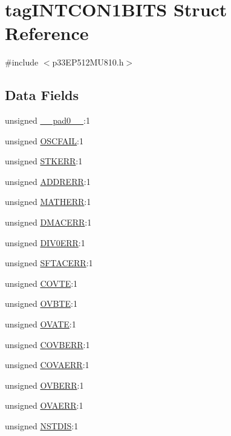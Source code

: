 \hypertarget{structtag_i_n_t_c_o_n1_b_i_t_s}{}\section{tag\+I\+N\+T\+C\+O\+N1\+B\+I\+TS Struct Reference}
\label{structtag_i_n_t_c_o_n1_b_i_t_s}


{\ttfamily \#include $<$p33\+E\+P512\+M\+U810.\+h$>$}

\subsection*{Data Fields}
\begin{DoxyCompactItemize}
\item 
unsigned \hyperlink{structtag_i_n_t_c_o_n1_b_i_t_s_adf71f3d8410c1f1dbbc96680a92c49af}{\+\_\+\+\_\+pad0\+\_\+\+\_\+}\+:1
\item 
unsigned \hyperlink{structtag_i_n_t_c_o_n1_b_i_t_s_a5aca0e68eb2fe8e5e31d661f9902bab6}{O\+S\+C\+F\+A\+IL}\+:1
\item 
unsigned \hyperlink{structtag_i_n_t_c_o_n1_b_i_t_s_a453904e3420d35daa803230b74b1f9a3}{S\+T\+K\+E\+RR}\+:1
\item 
unsigned \hyperlink{structtag_i_n_t_c_o_n1_b_i_t_s_af0137f3203737dd7dd5634f5a04fbf13}{A\+D\+D\+R\+E\+RR}\+:1
\item 
unsigned \hyperlink{structtag_i_n_t_c_o_n1_b_i_t_s_ad8910233257a22d0ce9314af2b10b6c5}{M\+A\+T\+H\+E\+RR}\+:1
\item 
unsigned \hyperlink{structtag_i_n_t_c_o_n1_b_i_t_s_a9a9b3500fd6404edc5ab96d0da50d1e0}{D\+M\+A\+C\+E\+RR}\+:1
\item 
unsigned \hyperlink{structtag_i_n_t_c_o_n1_b_i_t_s_a761775fa059db1e71b3a64e6df35037a}{D\+I\+V0\+E\+RR}\+:1
\item 
unsigned \hyperlink{structtag_i_n_t_c_o_n1_b_i_t_s_a06c5b25ec77e5dcd41176d0ec54eb613}{S\+F\+T\+A\+C\+E\+RR}\+:1
\item 
unsigned \hyperlink{structtag_i_n_t_c_o_n1_b_i_t_s_a8b496776821b526919f5206045a1d69c}{C\+O\+V\+TE}\+:1
\item 
unsigned \hyperlink{structtag_i_n_t_c_o_n1_b_i_t_s_aa828f367273680f7a31dabf827ef2b57}{O\+V\+B\+TE}\+:1
\item 
unsigned \hyperlink{structtag_i_n_t_c_o_n1_b_i_t_s_a267cc548145c20602c3d3acc50718055}{O\+V\+A\+TE}\+:1
\item 
unsigned \hyperlink{structtag_i_n_t_c_o_n1_b_i_t_s_a71647ef7c7530a785bedf55723264047}{C\+O\+V\+B\+E\+RR}\+:1
\item 
unsigned \hyperlink{structtag_i_n_t_c_o_n1_b_i_t_s_a52776cbc3fa0ce5403558dce56919f05}{C\+O\+V\+A\+E\+RR}\+:1
\item 
unsigned \hyperlink{structtag_i_n_t_c_o_n1_b_i_t_s_aab15f5aa7a0de633707ab38d4e42eee5}{O\+V\+B\+E\+RR}\+:1
\item 
unsigned \hyperlink{structtag_i_n_t_c_o_n1_b_i_t_s_a00ac109fb1d9c1b3396f233874de8ac1}{O\+V\+A\+E\+RR}\+:1
\item 
unsigned \hyperlink{structtag_i_n_t_c_o_n1_b_i_t_s_a0fd09eaa4126629c0d3da0600bebd7a4}{N\+S\+T\+D\+IS}\+:1
\end{DoxyCompactItemize}


